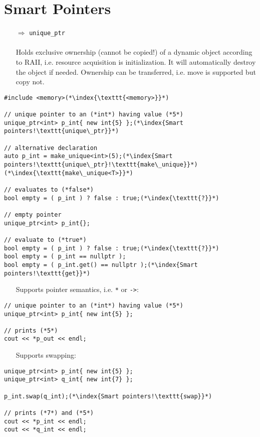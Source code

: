\documentclass[10pt]{book}
\begin{document}
\section{Smart Pointers}
\begin{enumerate}
\item[$\Rightarrow$] \texttt{unique\_ptr}\\ \\
Holds exclusive ownership (cannot be copied!) of a dynamic object according to RAII, i.e. resource acquisition is initialization. It will 
automatically destroy the object if needed. Ownership can be transferred, i.e. move is supported but copy not. 
\end{enumerate}
\begin{lstlisting}
#include <memory>(*\index{\texttt{<memory>}}*)

// unique pointer to an (*int*) having value (*5*)
unique_ptr<int> p_int{ new int{5} };(*\index{Smart pointers!\texttt{unique\_ptr}}*)

// alternative declaration
auto p_int = make_unique<int>(5);(*\index{Smart pointers!\texttt{unique\_ptr}!\texttt{make\_unique}}*)(*\index{\texttt{make\_unique<T>}}*)

// evaluates to (*false*)
bool empty = ( p_int ) ? false : true;(*\index{\texttt{?}}*)

// empty pointer
unique_ptr<int> p_int{};

// evaluate to (*true*)
bool empty = ( p_int ) ? false : true;(*\index{\texttt{?}}*)
bool empty = ( p_int == nullptr );
bool empty = ( p_int.get() == nullptr );(*\index{Smart pointers!\texttt{get}}*)
\end{lstlisting}
\begin{enumerate}
\item[] Supports pointer semantics, i.e. \texttt{*} or \texttt{->}:
\end{enumerate}
\begin{lstlisting}
// unique pointer to an (*int*) having value (*5*)
unique_ptr<int> p_int{ new int{5} };

// prints (*5*)
cout << *p_out << endl;
\end{lstlisting}
\begin{enumerate}
\item[] Supports swapping:
\end{enumerate}
\begin{lstlisting}
unique_ptr<int> p_int{ new int{5} };
unique_ptr<int> q_int{ new int{7} };
    
p_int.swap(q_int);(*\index{Smart pointers!\texttt{swap}}*)

// prints (*7*) and (*5*)
cout << *p_int << endl;
cout << *q_int << endl;
\end{lstlisting}
\end{document}

